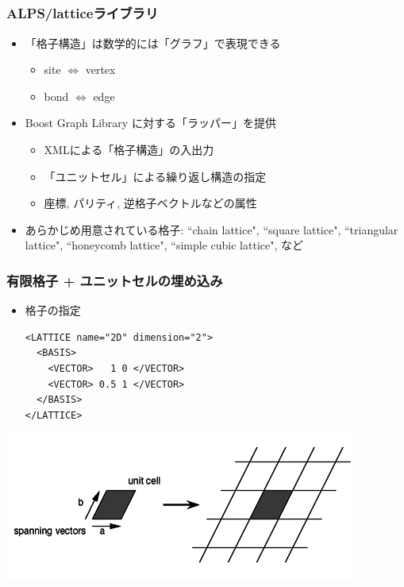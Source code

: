 \subsection*{\redm\whiteb\greenb}

\begin{frame}
  \frametitle{ALPS/latticeライブラリ}
  \begin{itemize}
    \setlength{\itemsep}{1em}
  \item 「格子構造」は数学的には「グラフ」で表現できる
    \begin{itemize}
    \item site $\Leftrightarrow$ vertex
    \item bond $\Leftrightarrow$ edge
    \end{itemize}
  \item Boost Graph Library に対する「ラッパー」を提供
    \begin{itemize}
    \item XMLによる「格子構造」の入出力
    \item 「ユニットセル」による繰り返し構造の指定
    \item 座標, パリティ, 逆格子ベクトルなどの属性
    \end{itemize}
  \item あらかじめ用意されている格子: ``chain lattice", ``square lattice", ``triangular lattice", ``honeycomb lattice", ``simple cubic lattice", など
  \end{itemize}
\end{frame}

\begin{frame}[t,fragile]
  \frametitle{有限格子 + ユニットセルの埋め込み}
  \begin{itemize}
  \item 格子の指定
  \begin{lstlisting}
<LATTICE name="2D" dimension="2">
  <BASIS>
    <VECTOR>   1 0 </VECTOR>
    <VECTOR> 0.5 1 </VECTOR>
  </BASIS>
</LATTICE>
\end{lstlisting}
  \end{itemize}
  \begin{center}
    \includegraphics[height=0.3\textheight]{TutorialLatticeHOWTOLattice1}
  \end{center}
\end{frame}

